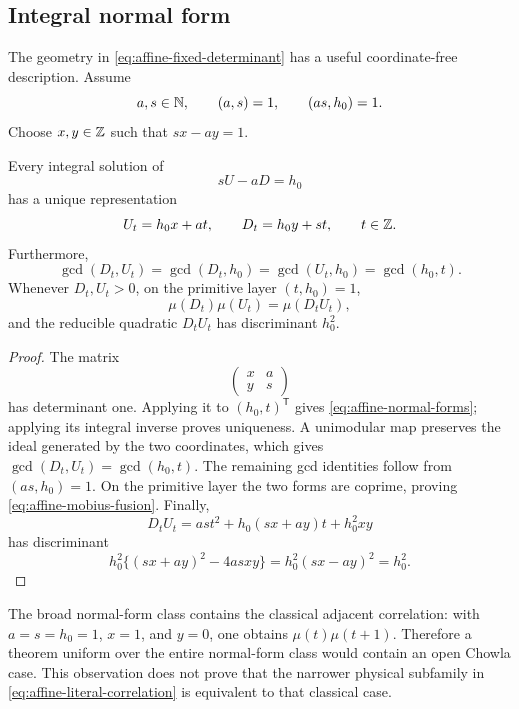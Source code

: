 \subsection{Integral normal form}

The geometry in \eqref{eq:affine-fixed-determinant} has a useful
coordinate-free description.  Assume
\[
 a,s\in\mathbb N,\qquad (a,s)=1,\qquad(as,h_0)=1.
\]
Choose \(x,y\in\mathbb Z\) such that \(sx-ay=1\).

\begin{proposition}
\label{prop:affine-normal-form}
Every integral solution of
\begin{equation}
 sU-aD=h_0
 \label{eq:affine-normal-equation}
\end{equation}
has a unique representation
\begin{equation}
 U_t=h_0x+at,\qquad
 D_t=h_0y+st,\qquad t\in\mathbb Z.
 \label{eq:affine-normal-forms}
\end{equation}
Furthermore,
\begin{equation}
 \gcd(D_t,U_t)
 =\gcd(D_t,h_0)
 =\gcd(U_t,h_0)
 =\gcd(h_0,t).
 \label{eq:affine-gcd-identities}
\end{equation}
Whenever \(D_t,U_t>0\), on the primitive layer \((t,h_0)=1\),
\begin{equation}
 \mu(D_t)\mu(U_t)=\mu(D_tU_t),
 \label{eq:affine-mobius-fusion}
\end{equation}
and the reducible quadratic \(D_tU_t\) has discriminant \(h_0^2\).
\end{proposition}

\begin{proof}
The matrix
\[
 \begin{pmatrix}x&a\\y&s\end{pmatrix}
\]
has determinant one.  Applying it to \((h_0,t)^{\mathsf T}\) gives
\eqref{eq:affine-normal-forms}; applying its integral inverse proves
uniqueness.  A unimodular map preserves the ideal generated by the
two coordinates, which gives
\(\gcd(D_t,U_t)=\gcd(h_0,t)\).  The remaining gcd identities follow
from \((as,h_0)=1\).  On the primitive layer the two forms are
coprime, proving \eqref{eq:affine-mobius-fusion}.  Finally,
\[
 D_tU_t
 =as t^2+h_0(sx+ay)t+h_0^2xy
\]
has discriminant
\[
 h_0^2\{(sx+ay)^2-4asxy\}
 =h_0^2(sx-ay)^2=h_0^2.
\]
\end{proof}

\begin{remark}
The broad normal-form class contains the classical adjacent
correlation: with \(a=s=h_0=1\), \(x=1\), and \(y=0\), one obtains
\(\mu(t)\mu(t+1)\).  Therefore a theorem uniform over the entire
normal-form class would contain an open Chowla case.  This observation
does not prove that the narrower physical subfamily in
\eqref{eq:affine-literal-correlation} is equivalent to that classical
case.
\end{remark}

